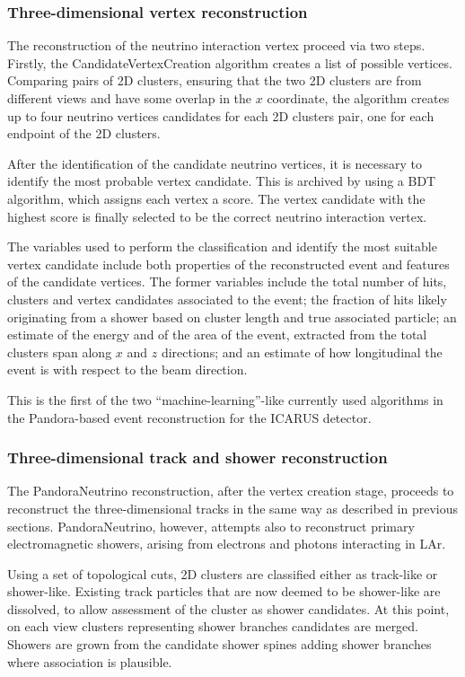 \subsubsection{Three-dimensional vertex reconstruction}

The reconstruction of the neutrino interaction vertex proceed via two steps. Firstly, the CandidateVertexCreation algorithm creates a list of possible vertices. Comparing pairs of 2D clusters, ensuring that the two 2D clusters are from different views and have some overlap in the $x$ coordinate, the algorithm creates up to four neutrino vertices candidates for each 2D clusters pair, one for each endpoint of the 2D clusters. 

After the identification of the candidate neutrino vertices, it is necessary to identify the most probable vertex candidate. This is archived by using a BDT algorithm, which assigns each vertex a score. The vertex candidate with the highest score is finally selected to be the correct neutrino interaction vertex. 

The variables used to perform the classification and identify the most suitable vertex candidate include both properties of the reconstructed event and features of the candidate vertices. The former variables include the total number of hits, clusters and vertex candidates associated to the event; the fraction of hits likely originating from a shower based on cluster length and true associated particle; an estimate of the energy and of the area of the event, extracted from the total clusters span along $x$ and $z$ directions; and an estimate of how longitudinal the event is with respect to the beam direction. 

This is the first of the two ``machine-learning''-like currently used algorithms in the Pandora-based event reconstruction for the ICARUS detector. 

\subsubsection{Three-dimensional track and shower reconstruction}

The PandoraNeutrino reconstruction, after the vertex creation stage, proceeds to reconstruct the three-dimensional tracks in the same way as described in previous sections. PandoraNeutrino, however, attempts also to reconstruct primary electromagnetic showers, arising from electrons and photons interacting in LAr. 

Using a set of topological cuts, 2D clusters are classified either as track-like or shower-like. Existing track particles that are now deemed to be shower-like are dissolved, to allow assessment of the cluster as shower candidates. At this point, on each view clusters representing shower branches candidates are merged. Showers are grown from the candidate shower spines adding shower branches where association is plausible. 

